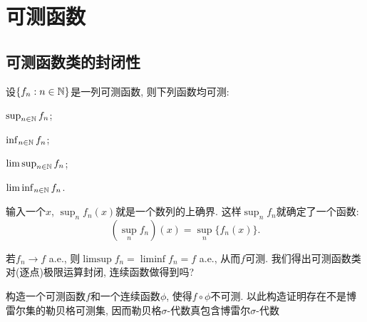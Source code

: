 \section{可测函数}
\subsection{可测函数类的封闭性}
设$\{f_n: n \in \mathbb{N}\}$是一列可测函数, 则下列函数均可测:
\begin{enumerate}
{\everymath{\displaystyle}
    \item $\sup_{n \in \mathbb{N}}f_n$;
    \item $\inf_{n \in \mathbb{N}} f_n$;
    \item $\limsup_{n \in \mathbb{N}} f_n$;
    \item $\liminf_{n \in \mathbb{N}} f_n$.}
\end{enumerate}
\begin{remark}
    输入一个$x$, $\sup_n f_n(x)$就是一个数列的上确界. 
    这样$\sup_n f_n$就确定了一个函数: 
    $$\left(\sup_n f_n\right)(x) = \sup_n \{f_n(x)\}.$$
\end{remark}
若$f_n \to f$ a.e., 则$\limsup f_n = \liminf f_n = f$ a.e., 从而$f$可测. 我们得出可测函数类对(逐点)极限运算封闭, 连续函数做得到吗? 

\begin{exercise}
    构造一个可测函数$f$和一个连续函数$\phi$, 使得$f \circ \phi$不可测.
    以此构造证明存在不是博雷尔集的勒贝格可测集, 因而勒贝格$\sigma$-代数真包含博雷尔$\sigma$-代数
\end{exercise}


